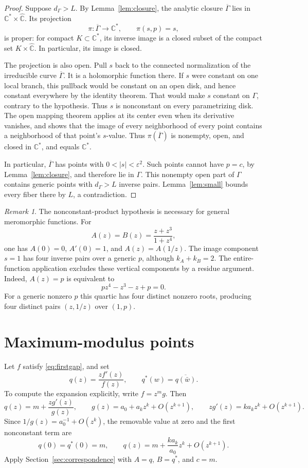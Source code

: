 \documentclass[11pt,reqno]{amsart}
\theoremstyle{remark}
\newtheorem{remark}[theorem]{Remark}
\numberwithin{equation}{section}
\newcommand{\C}{\mathbb C}
\newcommand{\Cs}{\C^*}
\newcommand{\Ps}{\widehat{\C}}
\begin{document}
\begin{proof}
Suppose $d_\Gamma>L$. By Lemma~\ref{lem:closure}, the analytic closure
$\overline\Gamma$ lies in $\Cs\times\Ps$. Its projection
\[
 \pi:\overline\Gamma\longrightarrow\Cs,\qquad \pi(s,p)=s,
\]
is proper: for compact $K\subset\Cs$, its inverse image is a closed
subset of the compact set $K\times\Ps$. In particular, its image is
closed.

The projection is also open. Pull $s$ back to the connected
normalization of the irreducible curve $\overline\Gamma$.
It is a holomorphic function there. If $s$ were constant on one
local branch, this pullback would be constant on an open disk,
and hence constant everywhere by the identity theorem. That
would make $s$ constant on $\Gamma$, contrary to the hypothesis.
Thus $s$ is nonconstant on every parametrizing disk. The open
mapping theorem applies at its center even when its derivative
vanishes, and shows that the image of every neighborhood of
every point contains a neighborhood of that point's $s$-value.
Thus $\pi(\overline\Gamma)$ is nonempty, open, and closed in
$\Cs$, and equals $\Cs$.

In particular, $\overline\Gamma$ has points with
$0<|s|<\varepsilon^2$. Such points cannot have $p=c$, by
Lemma~\ref{lem:closure}, and therefore lie in $\Gamma$. This nonempty
open part of $\Gamma$ contains generic points with $d_\Gamma>L$
inverse pairs. Lemma~\ref{lem:small} bounds every fiber there by $L$,
a contradiction.
\end{proof}

\begin{remark}\label{rem:vertical}
The nonconstant-product hypothesis is necessary for general
meromorphic functions. For
\[
 A(z)=B(z)=\frac{z+z^3}{1+z^4},
\]
one has $A(0)=0$, $A'(0)=1$, and $A(z)=A(1/z)$.
The image component $s=1$ has four inverse pairs over a generic $p$,
although $k_A+k_B=2$. The entire-function application excludes these
vertical components by a residue argument.
Indeed, $A(z)=p$ is equivalent to
\[
 pz^4-z^3-z+p=0.
\]
For a generic nonzero $p$ this quartic has four distinct nonzero
roots, producing four distinct pairs $(z,1/z)$ over $(1,p)$.
\end{remark}

\section{Maximum-modulus points}\label{sec:application}
Let $f$ satisfy \eqref{eq:firstgap}, and set
\begin{equation}\label{eq:q}
 q(z)=\frac{zf'(z)}{f(z)},\qquad
 q^*(w)=\overline{q(\bar w)}.
\end{equation}
To compute the expansion explicitly, write $f=z^m g$. Then
\[
 q(z)=m+\frac{zg'(z)}{g(z)},\qquad
 g(z)=a_0+a_kz^k+O(z^{k+1}),\qquad
 zg'(z)=ka_kz^k+O(z^{k+1}).
\]
Since $1/g(z)=a_0^{-1}+O(z^k)$, the removable value at zero
and the first nonconstant term are
\begin{equation}\label{eq:qexpansion}
 q(0)=q^*(0)=m,\qquad
 q(z)=m+\frac{k a_k}{a_0}z^k+O(z^{k+1}).
\end{equation}
Apply Section~\ref{sec:correspondence} with $A=q$, $B=q^*$, and $c=m$.
\end{document}
